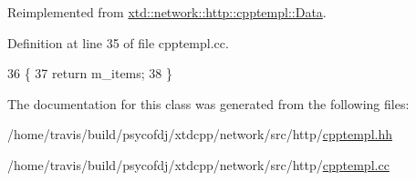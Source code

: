 Reimplemented from \hyperlink{classxtd_1_1network_1_1http_1_1cpptempl_1_1Data_abb82f257b867cd0da2469cc6c5ecdbae}{xtd\-::network\-::http\-::cpptempl\-::\-Data}.



Definition at line 35 of file cpptempl.\-cc.


\begin{DoxyCode}
36 \{
37   \textcolor{keywordflow}{return} m\_items;
38 \}
\end{DoxyCode}


The documentation for this class was generated from the following files\-:\begin{DoxyCompactItemize}
\item 
/home/travis/build/psycofdj/xtdcpp/network/src/http/\hyperlink{cpptempl_8hh}{cpptempl.\-hh}\item 
/home/travis/build/psycofdj/xtdcpp/network/src/http/\hyperlink{cpptempl_8cc}{cpptempl.\-cc}\end{DoxyCompactItemize}
